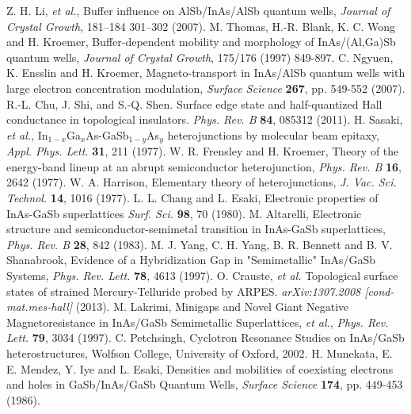 \documentclass[titlepage,a4paper]{book}
\begin{document}
\begin{thebibliography}{199}
Z. H. Li, \textit{et al.}, Buffer influence on AlSb/InAs/AlSb quantum wells, \textit{Journal of Crystal Growth}, 181–184 301–302 (2007).
M. Thomas, H.-R. Blank, K. C. Wong and H. Kroemer, Buffer-dependent mobility and morphology of InAs/(Al,Ga)Sb quantum wells, \textit{Journal of Crystal Growth}, 175/176 (1997) 849-897.
C. Ngyuen, K. Ensslin and H. Kroemer, Magneto-transport in InAs/AlSb quantum wells with large electron concentration modulation, \textit{Surface Science} \textbf{267}, pp. 549-552 (2007).
R.-L. Chu, J. Shi, and S.-Q. Shen. Surface edge state and half-quantized Hall conductance in topological insulators. \textit{Phys. Rev. B} \textbf{84}, 085312 (2011). 
H. Sasaki, \textit{et al.}, In$_{1-x}$Ga$_x$As-GaSb$_{1-y}$As$_y$ heterojunctions by molecular beam epitaxy, \textit{Appl. Phys. Lett.} \textbf{31}, 211 (1977).
W. R. Frensley and H. Kroemer, Theory of the energy-band lineup at an abrupt semiconductor heterojunction, \textit{Phys. Rev. B} \textbf{16}, 2642 (1977).
W. A. Harrison, Elementary theory of heterojunctions, \textit{J. Vac. Sci. Technol.} \textbf{14}, 1016 (1977).
L. L. Chang and L. Esaki, Electronic properties of InAs-GaSb superlattices \textit{Surf. Sci.} \textbf{98}, 70 (1980).
M. Altarelli, Electronic structure and semiconductor-semimetal transition in InAs-GaSb superlattices, \textit{Phys. Rev. B} \textbf{28}, 842 (1983).
M. J. Yang, C. H. Yang, B. R. Bennett and B. V. Shanabrook, Evidence of a Hybridization Gap in "Semimetallic" InAs/GaSb Systems, \textit{Phys. Rev. Lett.} \textbf{78}, 4613 (1997).
O. Crauste, \textit{et al.} Topological surface states of strained Mercury-Telluride probed by ARPES. \textit{arXiv:1307.2008 [cond-mat.mes-hall]} (2013).
M. Lakrimi, Minigaps and Novel Giant Negative Magnetoresistance in InAs/GaSb Semimetallic Superlattices, \textit{et al.}, \textit{Phys. Rev. Lett.} \textbf{79}, 3034 (1997).
C. Petchsingh, Cyclotron Resonance Studies on InAs/GaSb heterostructures, Wolfson College, University of Oxford, 2002.
H. Munekata, E. E. Mendez, Y. Iye and L. Esaki, Densities and mobilities of coexisting electrons and holes in GaSb/InAs/GaSb Quantum Wells, \textit{Surface Science} \textbf{174}, pp. 449-453 (1986).

\end{thebibliography}
\end{document}
